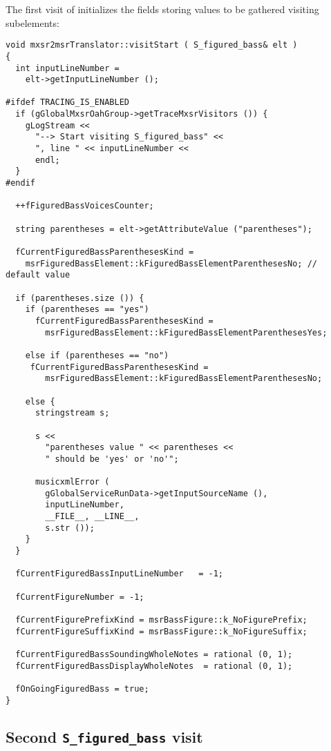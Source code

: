 The first visit of  initializes the fields storing values to be gathered visiting subelements:
\begin{lstlisting}[language=CPlusPlus]
void mxsr2msrTranslator::visitStart ( S_figured_bass& elt )
{
  int inputLineNumber =
    elt->getInputLineNumber ();

#ifdef TRACING_IS_ENABLED
  if (gGlobalMxsrOahGroup->getTraceMxsrVisitors ()) {
    gLogStream <<
      "--> Start visiting S_figured_bass" <<
      ", line " << inputLineNumber <<
      endl;
  }
#endif

  ++fFiguredBassVoicesCounter;

  string parentheses = elt->getAttributeValue ("parentheses");

  fCurrentFiguredBassParenthesesKind =
    msrFiguredBassElement::kFiguredBassElementParenthesesNo; // default value

  if (parentheses.size ()) {
    if (parentheses == "yes")
      fCurrentFiguredBassParenthesesKind =
        msrFiguredBassElement::kFiguredBassElementParenthesesYes;

    else if (parentheses == "no")
     fCurrentFiguredBassParenthesesKind =
        msrFiguredBassElement::kFiguredBassElementParenthesesNo;

    else {
      stringstream s;

      s <<
        "parentheses value " << parentheses <<
        " should be 'yes' or 'no'";

      musicxmlError (
        gGlobalServiceRunData->getInputSourceName (),
        inputLineNumber,
        __FILE__, __LINE__,
        s.str ());
    }
  }

  fCurrentFiguredBassInputLineNumber   = -1;

  fCurrentFigureNumber = -1;

  fCurrentFigurePrefixKind = msrBassFigure::k_NoFigurePrefix;
  fCurrentFigureSuffixKind = msrBassFigure::k_NoFigureSuffix;

  fCurrentFiguredBassSoundingWholeNotes = rational (0, 1);
  fCurrentFiguredBassDisplayWholeNotes  = rational (0, 1);

  fOnGoingFiguredBass = true;
}
\end{lstlisting}


\subsection{Second {\tt S_figured_bass} visit}

